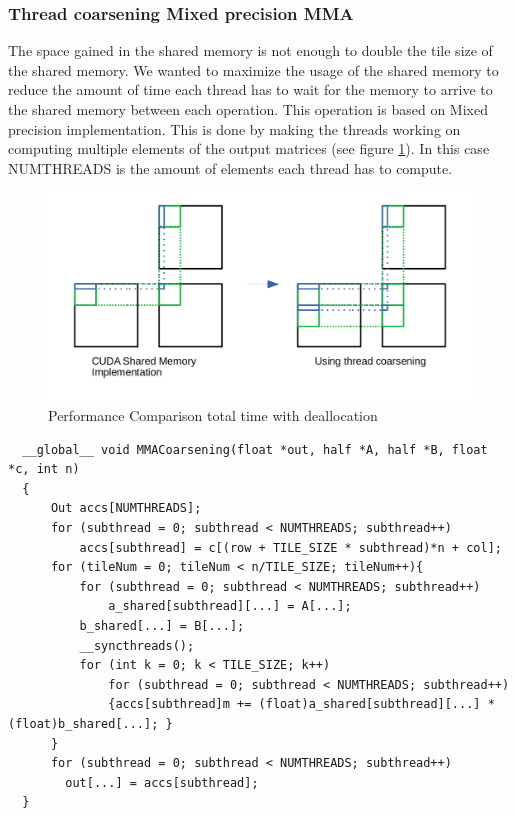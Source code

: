 \documentclass[conference]{IEEEtran}
\begin{document}
  \subsubsection[short]{Thread coarsening Mixed precision MMA}
  The space gained in the shared memory is not enough to double the tile size of the shared memory. We wanted 
  to maximize the usage of the shared memory to reduce the amount of time each thread has to wait for the memory
  to arrive to the shared memory between each operation. This operation is based on Mixed precision implementation.
  This is done by making the threads working on computing multiple elements of the output matrices (see figure \ref{fig:thread-coars}). In this case
  NUMTHREADS is the amount of elements each thread has to compute.
  \begin{figure}[h]
    \centering
    \includegraphics[scale=0.2]{figures/threadCoarsening.png}
    \caption{Performance Comparison total time with deallocation}
    \label{fig:thread-coars}
  \end{figure}

  \begin{lstlisting}
  __global__ void MMACoarsening(float *out, half *A, half *B, float *c, int n)
  {   
      Out accs[NUMTHREADS];
      for (subthread = 0; subthread < NUMTHREADS; subthread++)
          accs[subthread] = c[(row + TILE_SIZE * subthread)*n + col];
      for (tileNum = 0; tileNum < n/TILE_SIZE; tileNum++){
          for (subthread = 0; subthread < NUMTHREADS; subthread++)
              a_shared[subthread][...] = A[...];
          b_shared[...] = B[...];
          __syncthreads();
          for (int k = 0; k < TILE_SIZE; k++)
              for (subthread = 0; subthread < NUMTHREADS; subthread++)
              {accs[subthread]m += (float)a_shared[subthread][...] * (float)b_shared[...]; }
      }
      for (subthread = 0; subthread < NUMTHREADS; subthread++)
        out[...] = accs[subthread];
  }
  \end{lstlisting}
  
\end{document}
